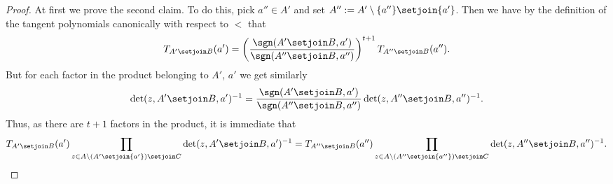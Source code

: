 \begin{proof}
  At first we prove the second claim. To do this, pick $a''\in A'$ and
  set $A'':=A'\setminus\{a''\}\setjoin\{a'\}$. Then we have by the
  definition of the tangent polynomials canonically with respect to $<$ that
  \begin{equation}
    T_{A'\setjoin B}(a') = \left(\frac{\sgn(A'\setjoin B,a')}{\sgn(A''\setjoin B,a'')}\right)^{t+1}T_{A''\setjoin B}(a'')\text{.}
  \end{equation}
  But for each factor in the product belonging to $A'$, $a'$ we get similarly
  \begin{equation}
    \det(z,A'\setjoin B,a')^{-1}=\frac{\sgn(A'\setjoin B,a')}{\sgn(A''\setjoin B,a'')}\det(z,A''\setjoin B,a'')^{-1}\text{.}
  \end{equation}
  Thus, as there are $t+1$ factors in the product, it is immediate that 
  \begin{align*}
    T_{A'\setjoin B}(a')\prod_{z\in A\setminus (A'\setjoin\{a'\})\setjoin C}\det(z,A'\setjoin B,a')^{-1} = T_{A''\setjoin B}(a'')\prod_{z\in A\setminus (A''\setjoin\{a''\})\setjoin C}\det(z,A''\setjoin B,a'')^{-1}\text{.}
  \end{align*}


\end{proof}
